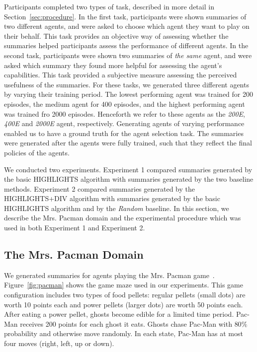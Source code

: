 Participants completed two types of task, described in more detail in Section~\ref{sec:procedure}. In the first task, participants were shown summaries of two different agents, and were asked to choose which agent they want to play on their behalf. This task provides an objective way of assessing whether the summaries helped participants assess the performance of different agents. In the second task, participants were shown two summaries of \emph{the same} agent, and were asked which summary they found more helpful for assessing the agent's capabilities. This task provided a subjective measure assessing the perceived usefulness of the summaries. For these tasks, we generated three different agents by varying their training period. The lowest performing agent was trained for 200 episodes, the medium agent for 400 episodes, and the highest performing agent was trained fro 2000 episodes. Henceforth we refer to these agents as the \emph{200E}, \emph{400E} and \emph{2000E} agent, respectively. Generating agents of varying performance enabled us to have a ground truth for the agent selection task. The summaries were generated after the agents were fully trained, such that they reflect the final policies of the agents.  

We conducted two experiments. Experiment 1 compared summaries generated by the basic HIGHLIGHTS algorithm with summaries generated by the two baseline methods. Experiment 2 compared summaries generated by the HIGHLIGHTS+DIV algorithm with summaries generated by the basic HIGHLIGHTS algorithm and by the \emph{Random} baseline. In this section, we describe the Mrs. Pacman domain and the experimental procedure which was used in both Experiment 1 and Experiment 2. 

\subsection{The Mrs. Pacman Domain}
We generated summaries for agents playing the Mrs. Pacman game~\cite{rohlfshagen2011ms}. Figure~\ref{fig:pacman} shows the game maze used in our experiments. This game configuration includes two types of food pellets: regular pellets (small dots) are worth 10 points each and power pellets (larger dots) are worth 50 points each. After eating a power pellet, ghosts become edible for a limited time period. Pac-Man receives 200 points for each ghost it eats. Ghosts chase Pac-Man with $80\%$ probability and otherwise move randomly. In each state, Pac-Man has at most four moves (right, left, up or down). 

